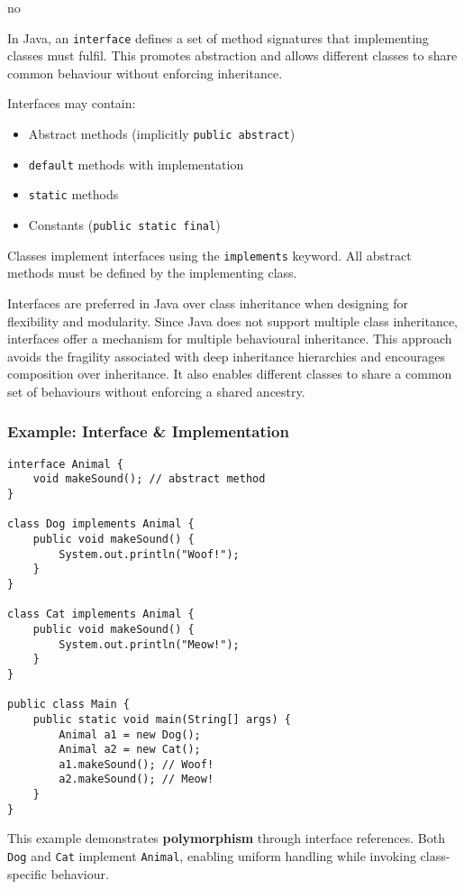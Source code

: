 no\documentclass{article}
\begin{document}
In Java, an \texttt{interface} defines a set of method signatures that implementing classes must fulfil. This promotes abstraction and allows different classes to share common behaviour without enforcing inheritance.

Interfaces may contain:
\begin{itemize}
    \item Abstract methods (implicitly \texttt{public abstract})
    \item \texttt{default} methods with implementation
    \item \texttt{static} methods
    \item Constants (\texttt{public static final})
\end{itemize}

Classes implement interfaces using the \texttt{implements} keyword. All abstract methods must be defined by the implementing class.

Interfaces are preferred in Java over class inheritance when designing for flexibility and modularity. Since Java does not support multiple class inheritance, interfaces offer a mechanism for multiple behavioural inheritance. This approach avoids the fragility associated with deep inheritance hierarchies and encourages composition over inheritance. It also enables different classes to share a common set of behaviours without enforcing a shared ancestry.


\subsubsection*{Example: Interface \& Implementation}

\begin{verbatim}
interface Animal {
    void makeSound(); // abstract method
}

class Dog implements Animal {
    public void makeSound() {
        System.out.println("Woof!");
    }
}

class Cat implements Animal {
    public void makeSound() {
        System.out.println("Meow!");
    }
}

public class Main {
    public static void main(String[] args) {
        Animal a1 = new Dog();
        Animal a2 = new Cat();
        a1.makeSound(); // Woof!
        a2.makeSound(); // Meow!
    }
}
\end{verbatim}

This example demonstrates \textbf{polymorphism} through interface references. Both \texttt{Dog} and \texttt{Cat} implement \texttt{Animal}, enabling uniform handling while invoking class-specific behaviour.
\end{document}
